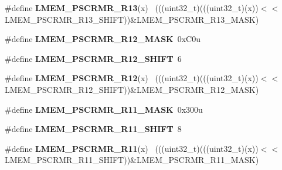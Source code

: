 \begin{DoxyCompactItemize}
\item 
\hypertarget{group___l_m_e_m___register___masks_gaff752d567f6ac57b55d581dc2fa0f5ef}{}\#define {\bfseries L\+M\+E\+M\+\_\+\+P\+S\+C\+R\+M\+R\+\_\+\+R13}(x)                                          ~(((uint32\+\_\+t)(((uint32\+\_\+t)(x))$<$$<$L\+M\+E\+M\+\_\+\+P\+S\+C\+R\+M\+R\+\_\+\+R13\+\_\+\+S\+H\+I\+F\+T))\&L\+M\+E\+M\+\_\+\+P\+S\+C\+R\+M\+R\+\_\+\+R13\+\_\+\+M\+A\+S\+K)\label{group___l_m_e_m___register___masks_gaff752d567f6ac57b55d581dc2fa0f5ef}

\item 
\hypertarget{group___l_m_e_m___register___masks_gaed95022446e7560ffe406fb15da48699}{}\#define {\bfseries L\+M\+E\+M\+\_\+\+P\+S\+C\+R\+M\+R\+\_\+\+R12\+\_\+\+M\+A\+S\+K}~0x\+C0u\label{group___l_m_e_m___register___masks_gaed95022446e7560ffe406fb15da48699}

\item 
\hypertarget{group___l_m_e_m___register___masks_ga8657d91b41b142a0d2f36a2c3c123661}{}\#define {\bfseries L\+M\+E\+M\+\_\+\+P\+S\+C\+R\+M\+R\+\_\+\+R12\+\_\+\+S\+H\+I\+F\+T}~6\label{group___l_m_e_m___register___masks_ga8657d91b41b142a0d2f36a2c3c123661}

\item 
\hypertarget{group___l_m_e_m___register___masks_ga9ae54ae9c290288477e90d184e06058a}{}\#define {\bfseries L\+M\+E\+M\+\_\+\+P\+S\+C\+R\+M\+R\+\_\+\+R12}(x)                                          ~(((uint32\+\_\+t)(((uint32\+\_\+t)(x))$<$$<$L\+M\+E\+M\+\_\+\+P\+S\+C\+R\+M\+R\+\_\+\+R12\+\_\+\+S\+H\+I\+F\+T))\&L\+M\+E\+M\+\_\+\+P\+S\+C\+R\+M\+R\+\_\+\+R12\+\_\+\+M\+A\+S\+K)\label{group___l_m_e_m___register___masks_ga9ae54ae9c290288477e90d184e06058a}

\item 
\hypertarget{group___l_m_e_m___register___masks_gaad08c4e893d2fd3e9d863c5b55988e4e}{}\#define {\bfseries L\+M\+E\+M\+\_\+\+P\+S\+C\+R\+M\+R\+\_\+\+R11\+\_\+\+M\+A\+S\+K}~0x300u\label{group___l_m_e_m___register___masks_gaad08c4e893d2fd3e9d863c5b55988e4e}

\item 
\hypertarget{group___l_m_e_m___register___masks_gacf9d55f8d2ec9a50eac3ac40889a9309}{}\#define {\bfseries L\+M\+E\+M\+\_\+\+P\+S\+C\+R\+M\+R\+\_\+\+R11\+\_\+\+S\+H\+I\+F\+T}~8\label{group___l_m_e_m___register___masks_gacf9d55f8d2ec9a50eac3ac40889a9309}

\item 
\hypertarget{group___l_m_e_m___register___masks_ga07836e19b33aa790e4182c86922a233d}{}\#define {\bfseries L\+M\+E\+M\+\_\+\+P\+S\+C\+R\+M\+R\+\_\+\+R11}(x)                                          ~(((uint32\+\_\+t)(((uint32\+\_\+t)(x))$<$$<$L\+M\+E\+M\+\_\+\+P\+S\+C\+R\+M\+R\+\_\+\+R11\+\_\+\+S\+H\+I\+F\+T))\&L\+M\+E\+M\+\_\+\+P\+S\+C\+R\+M\+R\+\_\+\+R11\+\_\+\+M\+A\+S\+K)\label{group___l_m_e_m___register___masks_ga07836e19b33aa790e4182c86922a233d}


\end{DoxyCompactItemize}
